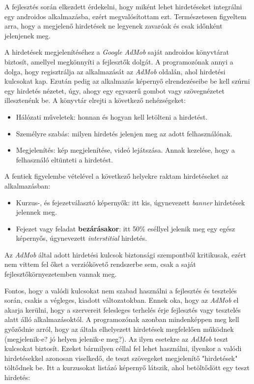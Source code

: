 \documentclass[12pt,a4paper]{article}
\begin{document}
	A fejlesztés során elkezdett érdekelni, hogy miként lehet hirdetéseket integrálni egy androidos alkalmazásba, ezért megvalósítottam ezt. Természetesen figyeltem arra, hogy a megjelenő hirdetések ne legyenek zavaróak és csak időnként jelenjenek meg.
	
	A hirdetések megjelenítéséhez a \textit{Google AdMob} saját androidos könyvtárat biztosít, amellyel megkönnyíti a fejlesztők dolgát. A programozónak annyi a dolga, hogy regisztrálja az alkalmazását az \textit{AdMob} oldalán, ahol hirdetési kulcsokat kap. Ezután pedig az alkalmazás képernyő elrendezéseibe be kell szúrni egy hirdetés nézetet, úgy, ahogy egy egyszerű gombot vagy szövegnézetet illesztenénk be. A könyvtár elrejti a következő nehézségeket:
	
	\begin{itemize}
		\item Hálózati műveletek: honnan és hogyan kell letölteni a hirdetést.
		\item Személyre szabás: milyen hirdetés jelenjen meg az adott felhasználónak.
		\item Megjelenítés: kép megjelenítése, videó lejátszása. Annak kezelése, hogy a felhasználó eltünteti a hirdetést.
	\end{itemize} 

	A fentiek figyelembe vételével a következő helyekre raktam hirdetéseket az alkalmazásban:
	
	\begin{itemize}
		\item Kurzus-, és fejezetválasztó képernyők: itt kis, úgynevezett \textit{banner} hirdetések jelennek meg.
		\item Fejezet vagy feladat \textbf{bezárásakor}: itt 50\% eséllyel jelenik meg egy egész képernyős, úgynevezett \textit{interstitial} hirdetés.
	\end{itemize}

	Az \textit{AdMob} által adott hirdetési kulcsok biztonsági szempontból kritikusak, ezért nem vittem fel őket a verziókövető rendszerbe sem, csak a saját fejlesztőkörnyezetemben vannak meg. 
	
	Fontos, hogy a valódi kulcsokat nem szabad használni a fejlesztés és tesztelés során, csakis a végleges, kiadott változatokban. Ennek oka, hogy az \textit{AdMob} el akarja kerülni, hogy a szervereit felesleges terhelés érje fejlesztés vagy tesztelés alatt álló alkalmazásoktól. A programozónak azonban mindenképpen meg kell győződnie arról, hogy az általa elhelyezett hirdetések megfelelően működnek (megjelenik-e? jó helyen jelenik-e meg?). Az ilyen esetekre az \textit{AdMob} teszt kulcsokat biztosít. Ezeket bármilyen céllal fel lehet használni, ilyenkor a valódi hirdetésekkel azonosan viselkedő, de teszt szövegeket megjelenítő "hirdetések" töltődnek be. Itt a kurzusokat listázó képernyő látszik, ahol betöltődött egy teszt hirdetés:  
	
\end{document}
